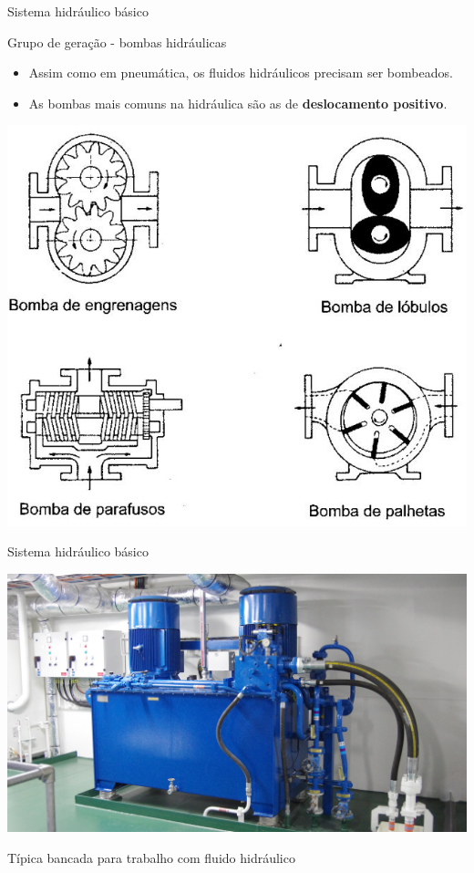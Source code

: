 \begin{frame}{Sistema hidráulico básico}
	\begin{block}{Grupo de geração - bombas hidráulicas}
		\begin{itemize}
			\item Assim como em pneumática, os fluidos hidráulicos precisam ser bombeados.
			\item As bombas mais comuns na hidráulica são as de \textbf{deslocamento positivo}.
		\end{itemize}
	\end{block}
	
	\centering
	\includegraphics[width=0.45\linewidth]{Figuras/Ch15/fig5}
	
\end{frame}


\begin{frame}{Sistema hidráulico básico}

	\centering
	\includegraphics[width=0.9\linewidth]{Figuras/Ch15/fig9}
	
	\medskip
	
	Típica bancada para trabalho com fluido hidráulico
	
\end{frame}


